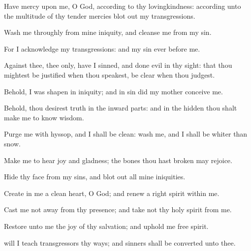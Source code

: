 {\Q {}Have
mercy upon me, O
God, according to thy
lovingkindness: according unto the
multitude of thy tender
mercies blot
out my
transgressions.


\par }{\Q {}Wash me
throughly from mine
iniquity, and
cleanse me from my
sin.


\par }{\Q {}For I
acknowledge my
transgressions: and my
sin
{}
ever before me.


\par }{\Q {}Against thee, thee only, have I
sinned, and
done
{}
evil in thy
sight: that thou mightest be
justified when thou
speakest,
{} be
clear when thou
judgest.


\par }{\Q {}Behold, I was
shapen in
iniquity; and in
sin did my
mother
conceive me.


\par }{\Q {}Behold, thou
desirest
truth in the inward
parts: and in the
hidden
{} thou shalt make me to
know
wisdom.


\par }{\BB \par }
{\Q {}Purge me with
hyssop, and I shall be
clean:
wash me, and I shall be
whiter than
snow.


\par }{\Q {}Make me to
hear
joy and
gladness;
{} the
bones
{} thou hast
broken may
rejoice.


\par }{\Q {}Hide thy
face from my
sins, and blot
out all mine
iniquities.


\par }{\Q {}Create in me a
clean
heart, O
God; and
renew a
right
spirit
within me.


\par }{\Q {}Cast me not
away from thy
presence; and
take not thy
holy
spirit from me.


\par }{\Q {}Restore unto me the
joy of thy
salvation; and
uphold me
{}
free
spirit.


\par }{\Q {} will I
teach
transgressors thy
ways; and
sinners shall be
converted unto thee.


\par }{\BB \par }
